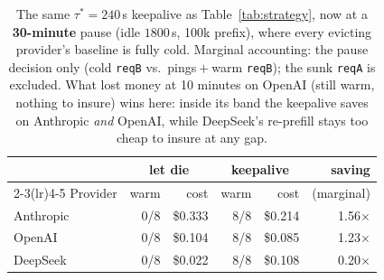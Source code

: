 \begin{table}[t]
\centering\footnotesize
\caption{The same $\tau^{\ast}{=}240$\,s keepalive as Table~\ref{tab:strategy},
now at a \textbf{30-minute} pause (idle $1800$\,s, 100k prefix), where every evicting provider's baseline is fully
cold. Marginal accounting: the pause decision only (cold \texttt{reqB} vs.\
pings${}+{}$warm \texttt{reqB}); the sunk \texttt{reqA} is excluded. What lost
money at 10 minutes on OpenAI (still warm, nothing to insure) wins here:
inside its band the keepalive saves on Anthropic \emph{and} OpenAI, while
DeepSeek's re-prefill stays too cheap to insure at any gap.}
\label{tab:bands}
\begin{tabular}{lrrrrr}
\toprule
 & \multicolumn{2}{c}{let die} & \multicolumn{2}{c}{keepalive} & saving \\
\cmidrule(lr){2-3}\cmidrule(lr){4-5}
Provider & warm & cost & warm & cost & (marginal) \\
\midrule
Anthropic & 0/8 & \$0.333 & 8/8 & \$0.214 & 1.56$\times$ \\
OpenAI & 0/8 & \$0.104 & 8/8 & \$0.085 & 1.23$\times$ \\
DeepSeek & 0/8 & \$0.022 & 8/8 & \$0.108 & 0.20$\times$ \\
\bottomrule
\end{tabular}
\end{table}
